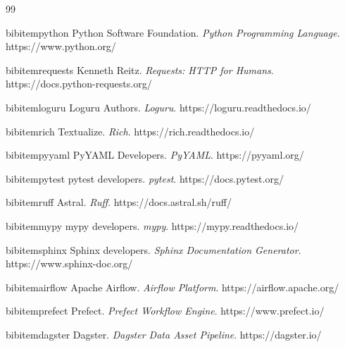 \documentclass[12pt,a4paper]{report}
\begin{document}
\begin{thebibliography}{99}
\sffamily

bibitem{python} Python Software Foundation. \textit{Python Programming Language}. https://www.python.org/

bibitem{requests} Kenneth Reitz. \textit{Requests: HTTP for Humans}. https://docs.python-requests.org/

bibitem{loguru} Loguru Authors. \textit{Loguru}. https://loguru.readthedocs.io/

bibitem{rich} Textualize. \textit{Rich}. https://rich.readthedocs.io/

bibitem{pyyaml} PyYAML Developers. \textit{PyYAML}. https://pyyaml.org/

bibitem{pytest} pytest developers. \textit{pytest}. https://docs.pytest.org/

bibitem{ruff} Astral. \textit{Ruff}. https://docs.astral.sh/ruff/

bibitem{mypy} mypy developers. \textit{mypy}. https://mypy.readthedocs.io/

bibitem{sphinx} Sphinx developers. \textit{Sphinx Documentation Generator}. https://www.sphinx-doc.org/

bibitem{airflow} Apache Airflow. \textit{Airflow Platform}. https://airflow.apache.org/

bibitem{prefect} Prefect. \textit{Prefect Workflow Engine}. https://www.prefect.io/

bibitem{dagster} Dagster. \textit{Dagster Data Asset Pipeline}. https://dagster.io/

\end{thebibliography}
\end{document}
